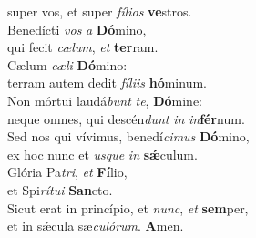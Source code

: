 \oddverse super vos, et super \textit{fí}\textit{li}\textit{os} \textbf{ve}stros.\\
\evenverse Benedícti \textit{vos} \textit{a} \textbf{Dó}mino,~\*\\
\evenverse qui fecit \textit{cæ}\textit{lum}, \textit{et} \textbf{ter}ram.\\
\oddverse Cælum \textit{cæ}\textit{li} \textbf{Dó}mino:~\*\\
\oddverse terram autem dedit \textit{fí}\textit{li}\textit{is} \textbf{hó}minum.\\
\evenverse Non mórtui laudá\textit{bunt} \textit{te}, \textbf{Dó}mine:~\*\\
\evenverse neque omnes, qui descén\textit{dunt} \textit{in} \textit{in}\textbf{fér}num.\\
\oddverse Sed nos qui vívimus, benedí\textit{ci}\textit{mus} \textbf{Dó}mino,~\*\\
\oddverse ex hoc nunc et \textit{us}\textit{que} \textit{in} \textbf{sǽ}culum.\\
\evenverse Glória Pa\textit{tri}, \textit{et} \textbf{Fí}lio,~\*\\
\evenverse et Spi\textit{rí}\textit{tu}\textit{i} \textbf{San}cto.\\
\oddverse Sicut erat in princípio, et \textit{nunc}, \textit{et} \textbf{sem}per,~\*\\
\oddverse et in sǽcula sæ\textit{cu}\textit{ló}\textit{rum}. \textbf{A}men.\\
